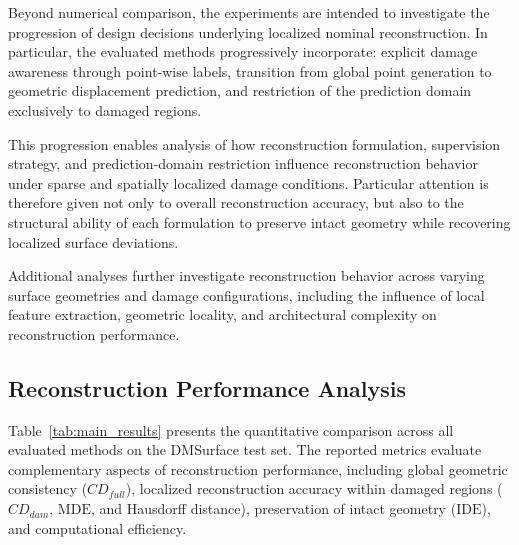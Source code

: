 Beyond numerical comparison, the experiments are intended to investigate the progression of design decisions underlying localized nominal reconstruction. In particular, the evaluated methods progressively incorporate: explicit damage awareness through point-wise labels, transition from global point generation to geometric displacement prediction, and restriction of the prediction domain exclusively to damaged regions.

This progression enables analysis of how reconstruction formulation, supervision strategy, and prediction-domain restriction influence reconstruction behavior under sparse and spatially localized damage conditions. Particular attention is therefore given not only to overall reconstruction accuracy, but also to the structural ability of each formulation to preserve intact geometry while recovering localized surface deviations.

Additional analyses further investigate reconstruction behavior across varying surface geometries and damage configurations, including the influence of local feature extraction, geometric locality, and architectural complexity on reconstruction performance.

\subsection{Reconstruction Performance Analysis}
\label{sec:qt_results}

Table~\ref{tab:main_results} presents the quantitative comparison across all evaluated methods on the DMSurface test set. The reported metrics evaluate complementary aspects of reconstruction performance, including global geometric consistency (${CD}_{full}$), localized reconstruction accuracy within damaged regions (${CD}_{dam}$, $\mathrm{MDE}$, and Hausdorff distance), preservation of intact geometry ($\mathrm{IDE}$), and computational efficiency.

